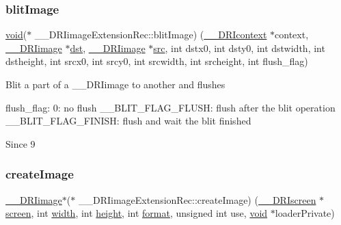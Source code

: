 \mbox{\label{struct_____d_r_iimage_extension_rec_aa6d6ca04ed7557f8e08322ca56b7d8fc}} 
\subsubsection{\texorpdfstring{blit\+Image}{blitImage}}
{\footnotesize\ttfamily \hyperlink{_s_d_l__opengles2__gl2ext_8h_ae5d8fa23ad07c48bb609509eae494c95}{void}($\ast$ \+\_\+\+\_\+\+D\+R\+Iimage\+Extension\+Rec\+::blit\+Image) (\hyperlink{dri__interface_8h_a3fd295cba82b5a3d79f1ee7e12bfb908}{\+\_\+\+\_\+\+D\+R\+Icontext} $\ast$context, \hyperlink{dri__interface_8h_a37e0407153595dc88fe5d25127645cf1}{\+\_\+\+\_\+\+D\+R\+Iimage} $\ast$\hyperlink{glcorearb_8h_a92034251bfd455d524a9b5610cddba00}{dst}, \hyperlink{dri__interface_8h_a37e0407153595dc88fe5d25127645cf1}{\+\_\+\+\_\+\+D\+R\+Iimage} $\ast$\hyperlink{glcorearb_8h_a72e0fdf0f845ded60b1fada9e9195cd7}{src}, int dstx0, int dsty0, int dstwidth, int dstheight, int srcx0, int srcy0, int srcwidth, int srcheight, int flush\+\_\+flag)}

Blit a part of a \+\_\+\+\_\+\+D\+R\+Iimage to another and flushes

flush\+\_\+flag\+: 0\+: no flush \+\_\+\+\_\+\+B\+L\+I\+T\+\_\+\+F\+L\+A\+G\+\_\+\+F\+L\+U\+SH\+: flush after the blit operation \+\_\+\+\_\+\+B\+L\+I\+T\+\_\+\+F\+L\+A\+G\+\_\+\+F\+I\+N\+I\+SH\+: flush and wait the blit finished

\begin{DoxySince}{Since}
9 
\end{DoxySince}
\mbox{\label{struct_____d_r_iimage_extension_rec_a500f4798f4932ecc0c99b8f2c070fabe}} 
\subsubsection{\texorpdfstring{create\+Image}{createImage}}
{\footnotesize\ttfamily \hyperlink{dri__interface_8h_a37e0407153595dc88fe5d25127645cf1}{\+\_\+\+\_\+\+D\+R\+Iimage}$\ast$($\ast$ \+\_\+\+\_\+\+D\+R\+Iimage\+Extension\+Rec\+::create\+Image) (\hyperlink{dri__interface_8h_a9961b01d421ee1fd6ed3c05acc9ca561}{\+\_\+\+\_\+\+D\+R\+Iscreen} $\ast$\hyperlink{cad_8h_ae04e09e4e3831bfc1632c509ae37dcec}{screen}, int \hyperlink{gl_8h_a9a82cf3caff84cabc4598e2619faac17}{width}, int \hyperlink{gl_8h_aa352f2804b9902ac30769c00dde75d5f}{height}, int \hyperlink{gl_8h_a71a65ffd977afe9c3fef116a5bc9ee27}{format}, unsigned int use, \hyperlink{_s_d_l__opengles2__gl2ext_8h_ae5d8fa23ad07c48bb609509eae494c95}{void} $\ast$loader\+Private)}

